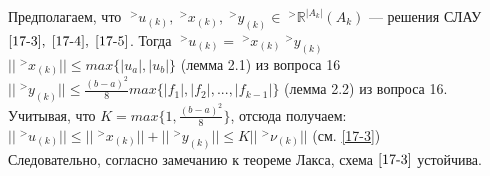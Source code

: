 \documentclass[__main__.tex]{subfiles}
\begin{document}
Предполагаем, что $\;^>u_{(k)}, \;^>x_{(k)}, \;^>y_{(k)} \in \;^>\mathbb{R}^{|A_k|}(A_k)$ — решения СЛАУ $\ref{17-3}, \; \ref{17-4}, \; \ref{17-5}$. Тогда $\;^>u_{(k)} = \;^>x_{(k)} \;^>y_{(k)}$\\
$||\;^>x_{(k)}|| \le max\{|u_a|, |u_b|\}$ (лемма 2.1) из вопроса 16\\
$||\;^>y_{(k)}|| \le \frac{(b-a)^2}{8} max\{|f_1|, |f_2|, ..., |f_{k-1}|\}$ (лемма 2.2) из вопроса 16.\\
Учитывая, что $K = max\{1, \frac{(b-a)^2}{8}\}$, отсюда получаем:\\
$||\;^>u_{(k)}|| \le ||\;^>x_{(k)}|| + ||\;^>y_{(k)}|| \le K ||\;^>\nu_{(k)}||$ (см. \ref{17-3})\\
Следовательно, согласно замечанию к теореме Лакса, схема $\ref{17-3}$ устойчива.
\end{document}
